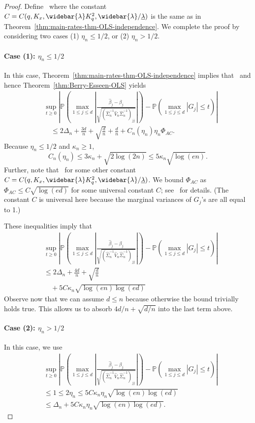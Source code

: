 \documentclass{article}
\begin{document}
\begin{appendices}
 \begin{proof}
 Define
 \,
 \]
 where the constant $C = C(q, K_x, \widebar{\lambda}K_q^2, \widebar{\lambda}/\underline{\lambda})$ is the same as in Theorem~\ref{thm:main-rates-thm-OLS-independence}. 
 We complete the proof by considering two cases (1) $\eta_n \le 1/2$, or (2) $\eta_n > 1/2$. 
 \paragraph{Case (1): $\eta_n \le 1/2$} In this case, Theorem~\ref{thm:main-rates-thm-OLS-independence} implies that
 \
 and hence Theorem~\ref{thm:Berry-Esseen-OLS} yields
 \begin{align*}
 &\sup_{t\ge 0}\left|\mathbb{P}\left(\max_{1\le j\le d}\left|\frac{\widehat{\beta}_j - \beta_j}{\sqrt{(\widehat{\Sigma}_n^{-1}\widehat{V}_n\widehat{\Sigma}_n^{-1})_{jj}}}\right|\right) - \mathbb{P}\left(\max_{1\le j\le d}|G_j| \le t\right)\right|\\
 &\quad\le 2\Delta_n + \frac{3d}{n} + \sqrt{\frac{d}{n}} + \frac{d}{n} + C_n(\eta_n)\eta_n\Phi_{AC}.
 \end{align*}
 Because $\eta_n \le 1/2$ and $\kappa_n \ge1$, 
 $$
 C_n(\eta_n) \le 3\kappa_n + \sqrt{2\log(2n)} \le 5\kappa_n\sqrt{\log(en)}.
 $$ 
 Further, note that
 \,
 \]
 for some other constant $C = C(q, K_x, \widebar{\lambda}K_q^2, \widebar{\lambda}/\underline{\lambda})$. We bound $\Phi_{AC}$ as $\Phi_{AC} \le C\sqrt{\log(ed)}$ for some universal constant $C$; see~\cite{Chern15,chernozhukov2017detailed} for details. (The constant $C$ is universal here because the marginal variances of $G_j$'s are all equal to 1.) 
 
 These inequalities imply that
 \begin{align*}
 &\sup_{t\ge 0}\left|\mathbb{P}\left(\max_{1\le j\le d}\left|\frac{\widehat{\beta}_j - \beta_j}{\sqrt{(\widehat{\Sigma}_n^{-1}\widehat{V}_n\widehat{\Sigma}_n^{-1})_{jj}}}\right|\right) - \mathbb{P}\left(\max_{1\le j\le d}|G_j| \le t\right)\right|\\
 &\le 2\Delta_n + \frac{4d}{n} + \sqrt{\frac{d}{n}}\\ 
 &\quad+ 5C\kappa_n\sqrt{\log(en)\log(ed)}\left.
 \end{align*}
 Observe now that we can assume $d \le n$ because otherwise the bound trivially holds true. This allows us to absorb $4d/n + \sqrt{d/n}$ into the last term above.
 \paragraph{Case (2): $\eta_n > 1/2$} In this case, we use
 \begin{align*}
 &\sup_{t\ge 0}\left|\mathbb{P}\left(\max_{1\le j\le d}\left|\frac{\widehat{\beta}_j - \beta_j}{\sqrt{(\widehat{\Sigma}_n^{-1}\widehat{V}_n\widehat{\Sigma}_n^{-1})_{jj}}}\right|\right) - \mathbb{P}\left(\max_{1\le j\le d}|G_j| \le t\right)\right|\\ 
 &\le 1 \le 2\eta_n \le 5C\kappa_n\eta_n\sqrt{\log(en)\log(ed)}\\ 
 &\le \Delta_n + 5C\kappa_n\eta_n\sqrt{\log(en)\log(ed)}.
 \end{align*}
 

\end{proof}
\end{appendices}
\end{document}
